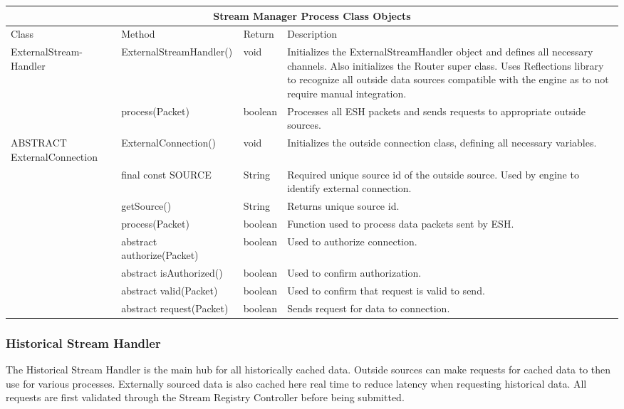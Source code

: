 \documentclass{article}
\begin{document}
\begin{flushleft}
\begin{center}
\begin{tabular}{ | p{3cm} || p{4cm} | p{2cm} | p{6cm} | }
\hline
\multicolumn{4}{|c|}{Stream Manager Process Class Objects}\\
\hline
Class & Method & Return & Description\\
\hline
ExternalStream- Handler & ExternalStreamHandler() & void & Initializes the ExternalStreamHandler object and defines all necessary channels. Also initializes the Router super class. Uses Reflections library to recognize all outside data sources compatible with the engine as to not require manual integration.\\
 & process(Packet) & boolean & Processes all ESH packets and sends requests to appropriate outside sources.\\
\hline
ABSTRACT ExternalConnection & ExternalConnection() & void & Initializes the outside connection class, defining all necessary variables.\\
 & final const SOURCE & String & Required unique source id of the outside source. Used by engine to identify external connection.\\
 & getSource() & String & Returns unique source id.\\
 & process(Packet) & boolean & Function used to process data packets sent by ESH.\\
 & abstract authorize(Packet) & boolean & Used to authorize connection.\\
 & abstract isAuthorized() & boolean & Used to confirm authorization.\\ 
 & abstract valid(Packet) & boolean & Used to confirm that request is valid to send.\\
 & abstract request(Packet) & boolean & Sends request for data to connection.\\
\hline

\end{tabular}
\end{center}
\end{flushleft}

\cleardoublepage
\subsubsection{Historical Stream Handler}
The Historical Stream Handler is the main hub for all historically cached data. Outside sources can make requests for cached data to then use for various processes. Externally sourced data is also cached here real time to reduce latency when requesting historical data. All requests are first validated through the Stream Registry Controller before being submitted.
\end{document}

